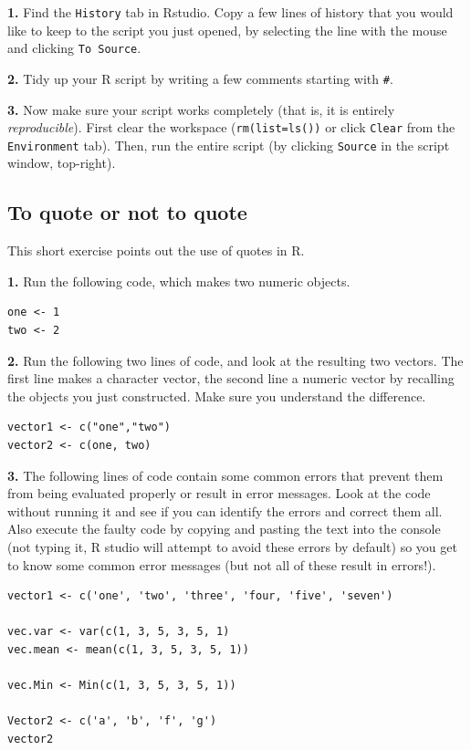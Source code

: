 \documentclass[]{book}
\begin{document}
\textbf{1.} Find the \texttt{History} tab in Rstudio. Copy a few lines of history that you would like to keep to the script you just opened, by selecting the line with the mouse and clicking \texttt{To\ Source}.

\textbf{2.} Tidy up your R script by writing a few comments starting with \texttt{\#}.

\textbf{3.} Now make sure your script works completely (that is, it is entirely \emph{reproducible}). First clear the workspace (\texttt{rm(list=ls())} or click \texttt{Clear} from the \texttt{Environment} tab). Then, run the entire script (by clicking \texttt{Source} in the script window, top-right).

\hypertarget{exquote}{%
\subsection{To quote or not to quote}\label{exquote}}

This short exercise points out the use of quotes in R.

\textbf{1.} Run the following code, which makes two numeric objects.

\begin{verbatim}
one <- 1
two <- 2
\end{verbatim}

\textbf{2.} Run the following two lines of code, and look at the resulting two vectors. The first line makes a character vector, the second line a numeric vector by recalling the objects you just constructed. Make sure you understand the difference.

\begin{verbatim}
vector1 <- c("one","two")
vector2 <- c(one, two)
\end{verbatim}

\textbf{3.} The following lines of code contain some common errors that prevent them from being evaluated properly or result in error messages. Look at the code without running it and see if you can identify the errors and correct them all. Also execute the faulty code by copying and pasting the text into the console (not typing it, R studio will attempt to avoid these errors by default) so you get to know some common error messages (but not all of these result in errors!).

\begin{verbatim}
vector1 <- c('one', 'two', 'three', 'four, 'five', 'seven')

vec.var <- var(c(1, 3, 5, 3, 5, 1)
vec.mean <- mean(c(1, 3, 5, 3, 5, 1))

vec.Min <- Min(c(1, 3, 5, 3, 5, 1))

Vector2 <- c('a', 'b', 'f', 'g')
vector2
\end{verbatim}
\end{document}
